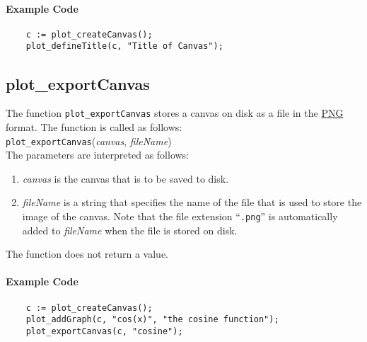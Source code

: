 \paragraph{Example Code}
\begin{verbatim}
    c := plot_createCanvas();
    plot_defineTitle(c, "Title of Canvas");
\end{verbatim}

\subsection{plot\_exportCanvas}
The function \texttt{plot\_exportCanvas} stores a canvas on disk as a file in the
\href{https://en.wikipedia.org/wiki/Portable_Network_Graphics}{PNG} format.
The function is called as follows:
\\[0.2cm]
\hspace*{1.3cm}
\texttt{plot\_exportCanvas}(\textsl{canvas}, \textsl{fileName})
\\[0.2cm]
The parameters are interpreted as follows:
\begin{enumerate}
\item \textsl{canvas} is the canvas that is to be saved to disk.
\item \textsl{fileName} is a string that specifies the name of the file that is used to store the
      image of the canvas.  Note that the file extension ``\texttt{.png}'' is automatically added to
      \textsl{fileName} when the file is stored on disk.
\end{enumerate}
The function does not return a value.

\paragraph{Example Code}
\begin{verbatim}
    c := plot_createCanvas();
    plot_addGraph(c, "cos(x)", "the cosine function");
    plot_exportCanvas(c, "cosine");
\end{verbatim}


